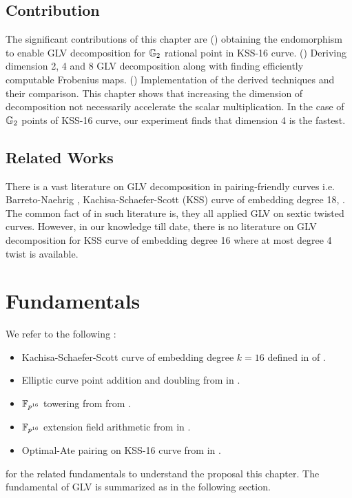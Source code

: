 \subsection{Contribution}
The significant contributions of this chapter are () obtaining the endomorphism to enable GLV decomposition for ${\mathbb{G}}_{2}$ rational point in KSS-16 curve. 
() Deriving dimension 2, 4 and 8 GLV decomposition along with finding efficiently computable Frobenius maps. () Implementation of the derived techniques and their comparison. 
This chapter shows that increasing the dimension of decomposition not necessarily accelerate the scalar multiplication. 
In the case of ${\mathbb{G}}_{2}$ points of KSS-16 curve, our experiment finds that dimension 4 is the fastest. 

\subsection{Related Works}
There is a vast literature on GLV decomposition in pairing-friendly curves i.e.  Barreto-Naehrig \cite{SAC:BarNae05}, Kachisa-Schaefer-Scott (KSS) curve of embedding degree 18,  \cite{CANS:SNOKM08, khandaker2017improvement, DBLP:journals/ieicet/NogamiSONAM09, faz2015efficient, JC:GalLinSco11}. 
The common fact of in such literature is, they all applied GLV on sextic twisted curves. 
However, in our knowledge till date, there is no literature on GLV decomposition for  KSS curve of embedding degree 16 where at most degree 4 twist is available.



\section{Fundamentals}
\label{sec:ch:candar18:fundamental}

We refer to the following :
\begin{itemize}
	\item Kachisa-Schaefer-Scott curve of embedding degree $k=16$ defined in   of .
	\item Elliptic curve point addition and doubling from  in .
	\item $\mathbb{F}_{p^{16}}$ towering from  from .
	\item $\mathbb{F}_{p^{16}}$ extension field arithmetic from  in .
	\item Optimal-Ate pairing on KSS-16 curve from  in .
\end{itemize}
for the related fundamentals to understand the proposal this chapter.
The fundamental of GLV is summarized as in the following section.

